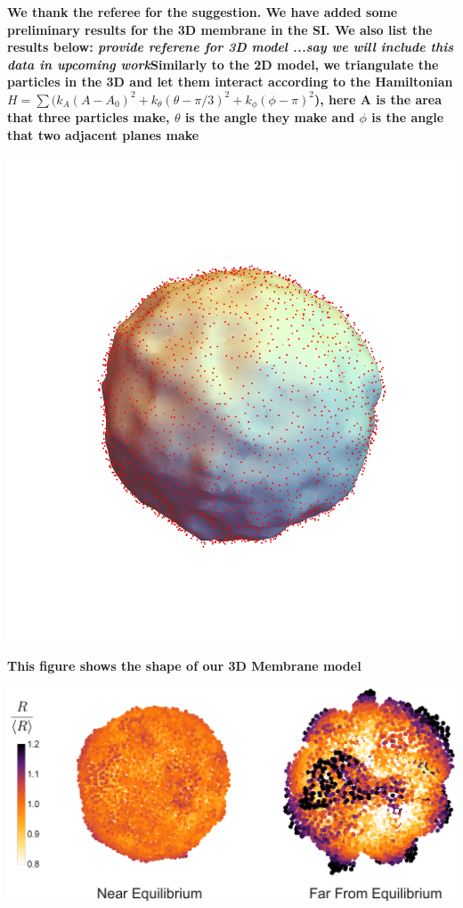 \documentclass{letter}
\begin{document}
\begin{letter}{}
{\bf
We thank the referee for the suggestion. We have added some preliminary results for the 3D membrane in the SI. We also list the results below:
{\it provide referene for 3D model ...say we will include this data in upcoming work}Similarly to the 2D model, we triangulate the particles in the 3D and let them interact according to the Hamiltonian $H=\sum (k_A(A-A_0)^2 + k_\theta (\theta-\pi/3)^2 + k_\phi (\phi-\pi)^2$), here A is the area that three particles make, $\theta$ is the angle they make and $\phi$ is the angle that two adjacent planes make}

\begin{minipage}{\textwidth}
\includegraphics[scale=0.35]{3DMembraneShapeProjectedSurface.pdf}
\centering
\end{minipage}

{\bf
This figure shows the shape of our 3D Membrane model}

\begin{minipage}{\textwidth}
\includegraphics[scale=0.35]{3DMembraneRelativeRadius.pdf}
\centering
\end{minipage}


\end{letter}
\end{document}
